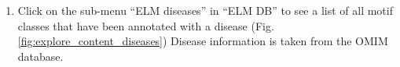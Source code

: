\begin{enumerate}
\item Click on the sub-menu ``ELM diseases'' in ``ELM DB'' to see a list of all
	motif classes that have been annotated with a disease
	(Fig. \ref{fig:explore_content_diseases}) Disease information is taken
	from the OMIM database.  


\end{enumerate}

